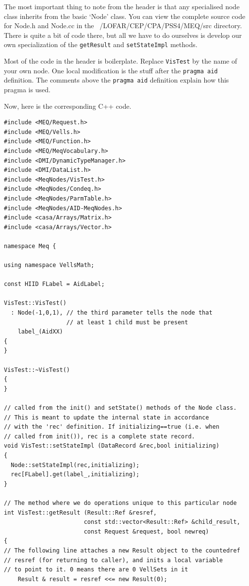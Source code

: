 \documentclass[10pt]{article}
\begin{document}
The most important thing to note from the header is that any
specialised node class inherits from the basic `Node' class.
You can view the complete source code for Node.h and Node.cc
in the ~/LOFAR/CEP/CPA/PSS4/MEQ/src directory. There is quite a
bit of code there, but all we have to do ourselves is develop
our own specialization of the {\tt getResult} and 
{\tt setStateImpl} methods. 

Most of the code in the header is boilerplate. Replace {\tt VisTest}
by the name of your own node. One local modification is the
stuff after the {\tt pragma aid} definition. The comments
above the {\tt pragma aid} definition explain how this pragma is
used.

Now, here is the corresponding C++ code.

\begin{verbatim}
#include <MEQ/Request.h>
#include <MEQ/Vells.h>
#include <MEQ/Function.h>
#include <MEQ/MeqVocabulary.h>
#include <DMI/DynamicTypeManager.h>
#include <DMI/DataList.h>
#include <MeqNodes/VisTest.h>
#include <MeqNodes/Condeq.h>
#include <MeqNodes/ParmTable.h>
#include <MeqNodes/AID-MeqNodes.h>
#include <casa/Arrays/Matrix.h>
#include <casa/Arrays/Vector.h>

namespace Meq {

using namespace VellsMath;

const HIID FLabel = AidLabel;

VisTest::VisTest()
  : Node(-1,0,1), // the third parameter tells the node that
                  // at least 1 child must be present
    label_(AidXX) 
{
}

VisTest::~VisTest()
{
}

// called from the init() and setState() methods of the Node class.
// This is meant to update the internal state in accordance 
// with the 'rec' definition. If initializing==true (i.e. when 
// called from init()), rec is a complete state record.
void VisTest::setStateImpl (DataRecord &rec,bool initializing)
{
  Node::setStateImpl(rec,initializing);
  rec[FLabel].get(label_,initializing);
}

// The method where we do operations unique to this particular node
int VisTest::getResult (Result::Ref &resref, 
                       const std::vector<Result::Ref> &child_result,
                       const Request &request, bool newreq)
{
// The following line attaches a new Result object to the countedref
// resref (for returning to caller), and inits a local variable 
// to point to it. 0 means there are 0 VellSets in it
	Result & result = resref <<= new Result(0);


\end{verbatim}
\end{document}
